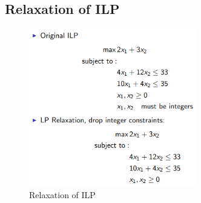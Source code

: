 \documentclass[12pt, a4paper]{article}
\begin{document}
\subsection*{Relaxation of ILP}
\begin{figure}[ht]
    \centering
    \includegraphics*[width=0.65\textwidth]{Relaxation_of_ILP}
    \caption{Relaxation of ILP}
    \label{fig: Relaxation of ILP}
\end{figure}
\end{document}
